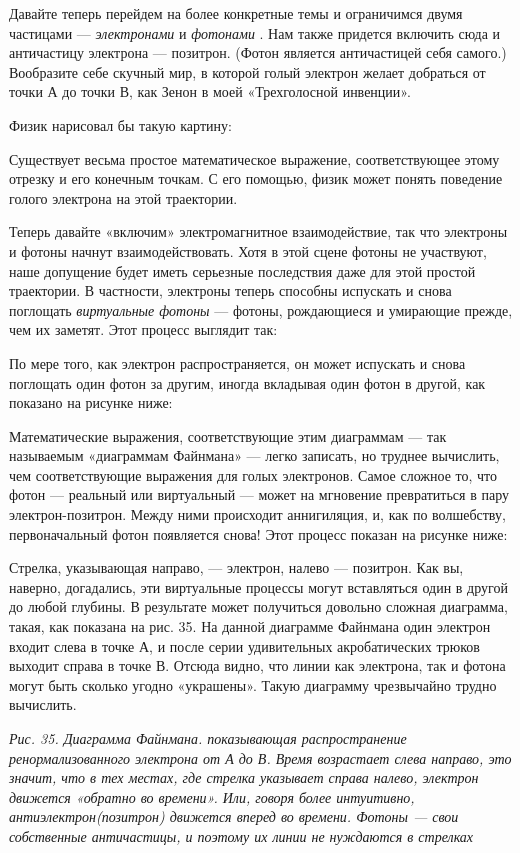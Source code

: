 Давайте теперь перейдем на более конкретные темы и ограничимся двумя частицами --- \emph{электронами} и \emph{фотонами} . Нам также придется включить сюда и античастицу электрона --- позитрон. (Фотон является античастицей себя самого.) Вообразите себе скучный мир, в которой голый электрон желает добраться от точки А до точки В, как Зенон в моей «Трехголосной инвенции».

Физик нарисовал бы такую картину:

Существует весьма простое математическое выражение, соответствующее этому отрезку и его конечным точкам. С его помощью, физик может понять поведение голого электрона на этой траектории.

Теперь давайте «включим» электромагнитное взаимодействие, так что электроны и фотоны начнут взаимодействовать. Хотя в этой сцене фотоны не участвуют, наше допущение будет иметь серьезные последствия даже для этой простой траектории. В частности, электроны теперь способны испускать и снова поглощать \emph{виртуальные фотоны} --- фотоны, рождающиеся и умирающие прежде, чем их заметят. Этот процесс выглядит так:

По мере того, как электрон распространяется, он может испускать и снова поглощать один фотон за другим, иногда вкладывая один фотон в другой, как показано на рисунке ниже:

Математические выражения, соответствующие этим диаграммам --- так называемым «диаграммам Файнмана» --- легко записать, но труднее вычислить, чем соответствующие выражения для голых электронов. Самое сложное то, что фотон --- реальный или виртуальный --- может на мгновение превратиться в пару электрон-позитрон. Между ними происходит аннигиляция, и, как по волшебству, первоначальный фотон появляется снова! Этот процесс показан на рисунке ниже:

Стрелка, указывающая направо, --- электрон, налево --- позитрон. Как вы, наверно, догадались, эти виртуальные процессы могут вставляться один в другой до любой глубины. В результате может получиться довольно сложная диаграмма, такая, как показана на рис. 35. На данной диаграмме Файнмана один электрон входит слева в точке А, и после серии удивительных акробатических трюков выходит справа в точке В. Отсюда видно, что линии как электрона, так и фотона могут быть сколько угодно «украшены». Такую диаграмму чрезвычайно трудно вычислить.

\emph{Рис. 35. Диаграмма Файнмана. показывающая распространение ренормализованного электрона от А до В. Время возрастает слева направо, это значит, что в тех местах, где стрелка указывает справа налево, электрон движется «обратно во времени». Или, говоря более интуитивно, антиэлектрон(позитрон) движется вперед во времени. Фотоны --- свои собственные античастицы, и поэтому их линии не нуждаются в стрелках}

